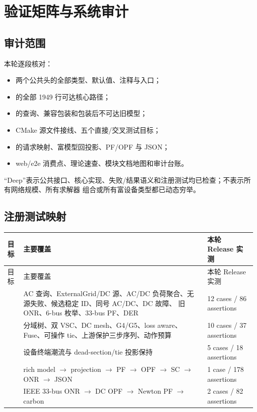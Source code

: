
\section{验证矩阵与系统审计}\label{sec:nr-verification}

\subsection{审计范围}

本轮逐段核对：
\begin{itemize}
  \item 两个公共头的全部类型、默认值、注释与入口；
  \item {} 的全部 1949 行可达核心路径；
  \item {} 的查询、兼容包装和包装后不可达旧模型；
  \item CMake 源文件接线、五个直接/交叉测试目标；
  \item {} 的请求映射、富模型回投影、PF/OPF 与 JSON；
  \item web/e2e 消费点、理论速查、模块文档地图和审计台账。
\end{itemize}
“Deep”表示公共接口、核心实现、失败/结果语义和注册测试均已检查；不表示所有网络规模、所有求解器
组合或所有富设备类型都已动态穷举。

\subsection{注册测试映射}

\begin{longtable}{@{}L{4.1cm}L{6.1cm}L{4.4cm}@{}}
\toprule
目标 & 主要覆盖 & 本轮 Release 实测\\
\midrule
\endfirsthead
\toprule
目标 & 主要覆盖 & 本轮 Release 实测\\
\midrule
\endhead
{} &
AC 查询、ExternalGrid/DC 源、AC/DC 负荷聚合、无源失败、候选稳定 ID、同号 AC/DC、DC 故障、
旧 ONR、6-bus 枚举、33-bus PF、DER & 12 cases / 86 assertions\\
 &
分域树、双 VSC、DC mesh、G4/G5、loss aware、Fuse、可操作 tie、上游保护三步序列、动作预算 &
10 cases / 37 assertions\\
 &
设备终端潮流与 dead-section/tie 投影保持 & 5 cases / 18 assertions\\
 &
rich model $\to$ projection $\to$ PF $\to$ OPF $\to$ SC $\to$ ONR $\to$ JSON &
1 case / 178 assertions\\
 &
IEEE 33-bus ONR $\to$ DC OPF $\to$ Newton PF $\to$ carbon & 2 cases / 82 assertions\\
\bottomrule
\end{longtable}

